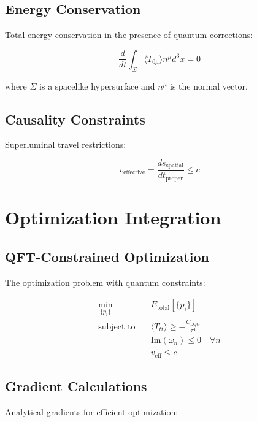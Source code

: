 \documentclass[12pt,a4paper]{article}
\begin{document}
\subsection{Energy Conservation}

Total energy conservation in the presence of quantum corrections:

\begin{equation}
\frac{d}{dt} \int_\Sigma \langle T_{0\mu} \rangle n^\mu d^3x = 0
\end{equation}

where $\Sigma$ is a spacelike hypersurface and $n^\mu$ is the normal vector.

\subsection{Causality Constraints}

Superluminal travel restrictions:

\begin{equation}
v_{\text{effective}} = \frac{ds_{\text{spatial}}}{dt_{\text{proper}}} \leq c
\end{equation}

\section{Optimization Integration}

\subsection{QFT-Constrained Optimization}

The optimization problem with quantum constraints:

\begin{align}
\min_{\{p_i\}} &\quad E_{\text{total}}[\{p_i\}] \\
\text{subject to} &\quad \langle T_{tt} \rangle \geq -\frac{C_{\text{LQG}}}{\tau^4} \\
&\quad \text{Im}(\omega_n) \leq 0 \quad \forall n \\
&\quad v_{\text{eff}} \leq c
\end{align}

\subsection{Gradient Calculations}

Analytical gradients for efficient optimization:
\end{document}
